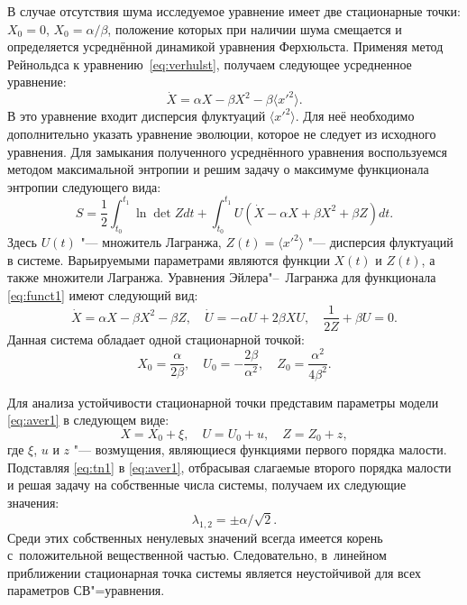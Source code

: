 В случае отсутствия шума исследуемое уравнение имеет две стационарные точки:
$
X_0=0$, $X_0={\alpha}/{\beta}$,
положение которых при наличии шума смещается и определяется усреднённой динамикой уравнения Ферхюльста. 
Применяя метод Рейнольдса к уравнению~\eqref{eq:verhulst}, получаем следующее усредненное уравнение:
\begin{equation}
\dot{X} = \alpha X - \beta X^2 - \beta \langle x'^2\rangle.
\end{equation}
В это уравнение входит дисперсия флуктуаций $\langle x'^2 \rangle$. Для неё необходимо дополнительно указать уравнение
эволюции, которое не следует из исходного уравнения. 
Для замыкания полученного усреднённого уравнения воспользуемся методом максимальной энтропии и решим задачу о максимуме функционала энтропии следующего вида:
\begin{equation}
S = \frac{1}{2} \int _{t_0}^{t_1} \ln\det Z dt
        +\int _{t_0}^{t_1} U(\dot{X}-\alpha X + \beta X^2 + \beta Z)dt.
        \label{eq:funct1}
\end{equation}
Здесь $U(t)$ "--- множитель Лагранжа, $Z(t)=\langle x'^2 \rangle$ "--- дисперсия флуктуаций в системе. 
Варьируемыми параметрами являются функции $X(t)$ и $Z(t)$, а также множители Лагранжа.
Уравнения Эйлера"--~Лагранжа для функционала \eqref{eq:funct1} имеют следующий вид:
\begin{equation}
\dot{X} = \alpha X - \beta X^2 - \beta Z, \quad \dot{U} = -\alpha
U + 2\beta XU, \quad \frac {1}{2Z} + \beta U = 0. \label{eq:aver1}
\end{equation}
Данная система обладает одной стационарной точкой:
\begin{equation}
X_0=\frac {\alpha}{2 \beta}, \quad U_0=-\frac {2 \beta}{\alpha^2},
\quad Z_0=\frac {\alpha^2}{4 \beta^2}.
\end{equation}

Для анализа устойчивости стационарной точки представим параметры модели \eqref{eq:aver1} в следующем виде:
\begin{equation}
X=X_0+\xi, \quad U=U_0+u, \quad Z=Z_0+z,  \label{eq:tn1}
\end{equation}
где $\xi$, $u$ и $z$ "--- возмущения, являющиеся функциями первого порядка малости. 
Подставляя \eqref{eq:tn1} в \eqref{eq:aver1}, отбрасывая слагаемые второго порядка малости и решая задачу на
собственные числа системы, получаем их следующие значения:
\begin{equation}
\lambda_{1,2}=\pm {\alpha}/{\sqrt{2}}.
\end{equation}
Среди этих собственных ненулевых значений всегда имеется корень с~положительной вещественной частью. 
Следовательно, в~линейном приближении стационарная точка системы является неустойчивой для всех параметров СВ"=уравнения.

